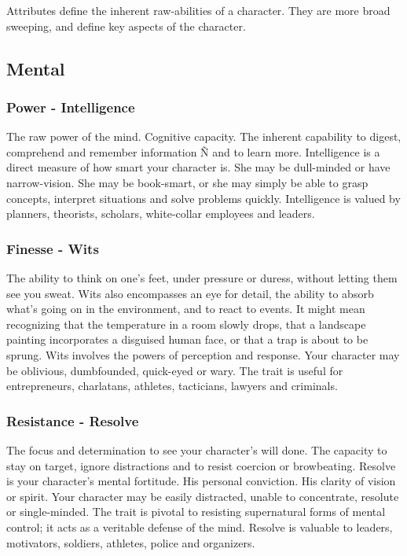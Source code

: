 \documentclass["../Misguided by Starlight.tex"]{subfiles}
\begin{document}
Attributes define the inherent raw-abilities of a character. They are more broad sweeping, and define key aspects of the character.

\subsection{Mental}
\subsubsection{Power - Intelligence}
The raw power of the mind. Cognitive capacity. The inherent capability to digest, comprehend and remember information
Ñ and to learn more. Intelligence is a direct measure of how smart your character is. She may be dull-minded or have narrow-vision. She may be book-smart, or she may simply be able to grasp concepts, interpret situations and solve problems quickly. Intelligence is valued by planners, theorists, scholars, white-collar employees and leaders.

\subsubsection{Finesse - Wits}
The ability to think on one's feet, under pressure or duress, without letting them see you sweat. Wits also encompasses an eye for detail, the ability to absorb what's going on in the environment, and to react to events. It might mean recognizing that the temperature in a room slowly drops, that a landscape painting incorporates a disguised human face, or that a trap is about to be sprung. Wits involves the powers of perception and response. Your character may be oblivious, dumbfounded, quick-eyed or wary. The trait is useful for entrepreneurs, charlatans, athletes, tacticians, lawyers and criminals.

\subsubsection{Resistance - Resolve}
The focus and determination to see your character's will done. The capacity to stay on target, ignore distractions and to resist coercion or browbeating. Resolve is your character's mental fortitude. His personal conviction. His clarity of vision or spirit. Your character may be easily distracted, unable to concentrate, resolute or single-minded. The trait is pivotal to resisting supernatural forms of mental control; it acts as a veritable defense of the mind. Resolve is valuable to leaders, motivators, soldiers, athletes, police and organizers.
\end{document}
